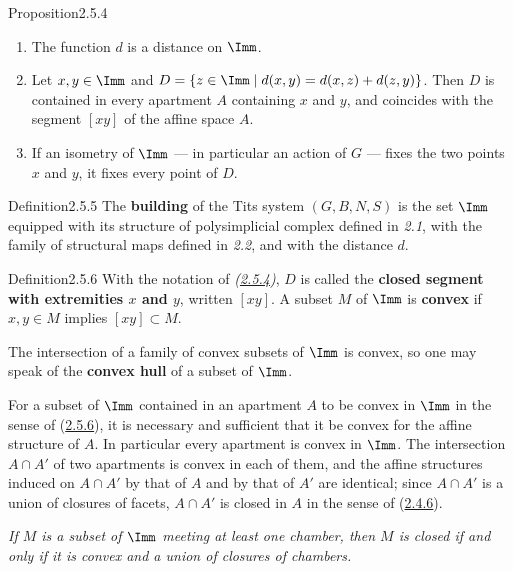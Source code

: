\documentclass[12pt,a4paper,oneside,english]{smfart}
\makeatletter
\newcommand{\btanchor}[1]{\leavevmode\Hy@raisedlink{\hypertarget{bt:#1}{}}}
\newcommand{\btref}[1]{\hyperlink{bt:#1}{#1}}
\theoremstyle{definition}
\theoremstyle{bt}
\makeatother
\begin{document}
\begin{BT}{Proposition}{2.5.4}\btanchor{2.5.4}
\begin{enumerate}[label=(\roman*),leftmargin=2.4em,itemsep=.25em]
\item The function $d$ is a distance on $\Imm$.
\item Let $x,y\in\Imm$ and
      $D=\{z\in\Imm\mid d(x,y)=d(x,z)+d(z,y)\}$.  Then $D$ is contained in
      every apartment $A$ containing $x$ and $y$, and coincides with the
      segment $[xy]$ of the affine space $A$.
\item If an isometry of $\Imm$ --- in particular an action of $G$ --- fixes
      the two points $x$ and $y$, it fixes every point of $D$.
\end{enumerate}
\end{BT}

\begin{BT}{Definition}{2.5.5}\btanchor{2.5.5}
The \textbf{building} of the Tits system $(G,B,N,S)$ is the set $\Imm$
equipped with its structure of polysimplicial complex defined in \emph{2.1},
with the family of structural maps defined in \emph{2.2}, and with the
distance $d$.
\end{BT}

\begin{BT}{Definition}{2.5.6}\btanchor{2.5.6}
With the notation of \emph{(\btref{2.5.4})}, $D$ is called the \textbf{closed segment
with extremities $x$ and $y$}, written $[xy]$.  A subset $M$ of $\Imm$ is
\textbf{convex} if $x,y\in M$ implies $[xy]\subset M$.
\end{BT}

\noindent
The intersection of a family of convex subsets of $\Imm$ is convex, so one may
speak of the \textbf{convex hull} of a subset of $\Imm$.

\btanchor{2.5.7}
For a subset of $\Imm$ contained in an apartment $A$ to be convex in $\Imm$ in
the sense of (\btref{2.5.6}), it is necessary and sufficient that it be convex for the
affine structure of $A$.  In particular every apartment is convex in $\Imm$.
The intersection $A\cap A'$ of two apartments is convex in each of them, and
the affine structures induced on $A\cap A'$ by that of $A$ and by that of $A'$
are identical; since $A\cap A'$ is a union of closures of facets, $A\cap A'$
is closed in $A$ in the sense of (\btref{2.4.6}).

\smallskip
\textit{If $M$ is a subset of $\Imm$ meeting at least one chamber, then $M$ is
closed if and only if it is convex and a union of closures of chambers.}
\end{document}
